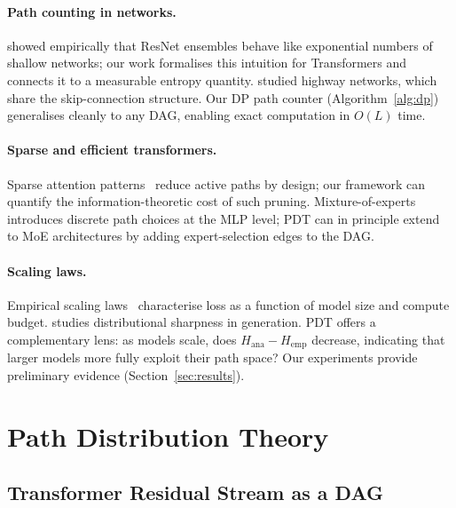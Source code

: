 \documentclass{article}
\newcommand{\Hana}{H_{\mathrm{ana}}}
\newcommand{\Hemp}{H_{\mathrm{emp}}}
\begin{document}
\paragraph{Path counting in networks.}
\citet{veit2016residual} showed empirically that ResNet ensembles behave like
exponential numbers of shallow networks; our work formalises this intuition for
Transformers and connects it to a measurable entropy quantity.
\citet{greff2017highway} studied highway networks, which share the skip-connection
structure.  Our DP path counter (Algorithm~\ref{alg:dp}) generalises cleanly to
any DAG, enabling exact computation in $O(L)$ time.

\paragraph{Sparse and efficient transformers.}
Sparse attention patterns~\citep{child2019generating,beltagy2020longformer,
zaheer2020bigbird} reduce active paths by design; our framework can quantify the
information-theoretic cost of such pruning.
Mixture-of-experts~\citep{shazeer2017outrageously,fedus2022switch} introduces
discrete path choices at the MLP level; PDT can in principle extend to MoE
architectures by adding expert-selection edges to the DAG.

\paragraph{Scaling laws.}
Empirical scaling laws~\citep{kaplan2020scaling,hoffmann2022training,biderman2023pythia}
characterise loss as a function of model size and compute budget.
\citet{holtzman2020curious} studies distributional sharpness in generation.
PDT offers a complementary lens: as models scale, does $\Hana - \Hemp$ decrease,
indicating that larger models more fully exploit their path space?  Our experiments
provide preliminary evidence (Section~\ref{sec:results}).

\section{Path Distribution Theory}
\label{sec:pdt}

\subsection{Transformer Residual Stream as a DAG}
\label{sec:dag}
\end{document}
